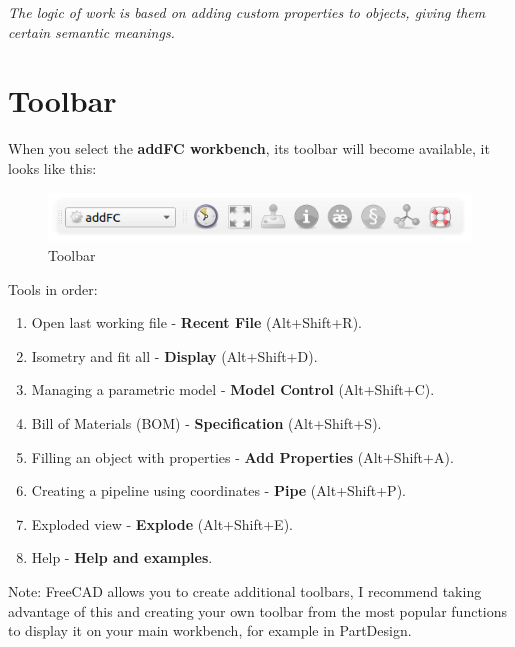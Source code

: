 \documentclass[a4paper,12pt]{article}
\begin{document}
\begin{center}\emph{The logic of work is based on adding custom properties to objects, giving them certain semantic meanings.}\end{center}



\section{Toolbar}
When you select the \textbf{addFC workbench}, its toolbar will become available, it looks like this:

\begin{figure}[htp]
\centering
\includegraphics[scale=0.8]{img/toolbar.png}
\caption{Toolbar}
\label{sec:toolbar}
\end{figure}

\begin{flushleft}Tools in order:\end{flushleft}
\begin{enumerate}
	\item Open last working file - \textbf{Recent File} (Alt+Shift+R).\label{sec:1}
	\item Isometry and fit all - \textbf{Display} (Alt+Shift+D).\label{sec:2}
	\item Managing a parametric model - \textbf{Model Control} (Alt+Shift+C).\label{sec:3}
	\item Bill of Materials (BOM) - \textbf{Specification} (Alt+Shift+S).\label{sec:4}
	\item Filling an object with properties - \textbf{Add Properties} (Alt+Shift+A).\label{sec:5}
	\item Creating a pipeline using coordinates - \textbf{Pipe} (Alt+Shift+P).\label{sec:6}
	\item Exploded view - \textbf{Explode} (Alt+Shift+E).\label{sec:7}
	\item Help - \textbf{Help and examples}.\label{sec:8}
\end{enumerate}

Note: FreeCAD allows you to create additional toolbars, I recommend taking advantage of this and creating your own toolbar from the most popular functions to display it on your main workbench, for example in PartDesign.

\end{document}
